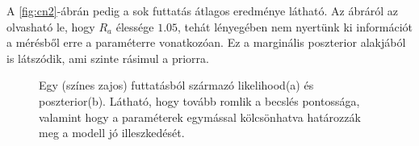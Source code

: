 A \ref{fig:cn2}-ábrán pedig a sok futtatás átlagos eredménye látható. Az ábráról az olvasható le, hogy $R_a$ élessége $1.05$, tehát lényegében nem nyertünk ki információt a mérésből erre a paraméterre vonatkozóan. Ez a marginális poszterior alakjából is látszódik, ami szinte rásimul a priorra. 

\begin{figure}[h!]
	\centering
	\caption[\textit{Stick and ball}, két paraméter, színes zaj együttes eloszlásai]{Egy (színes zajos) futtatásból származó likelihood(a) és poszterior(b). Látható, hogy tovább romlik a becslés pontossága, valamint hogy a paraméterek egymással kölcsönhatva határozzák meg a modell jó illeszkedését.}
	\label{fig:cn2_joint}
\end{figure}


